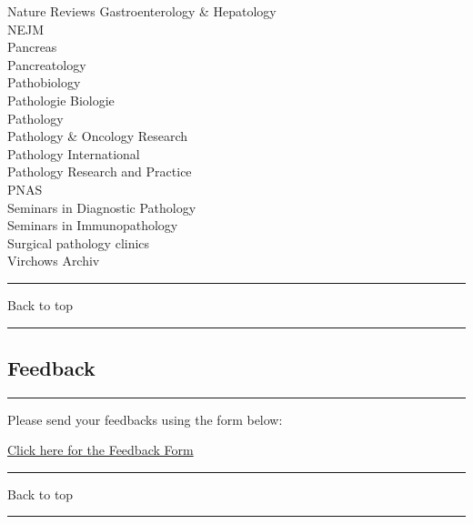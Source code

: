 \documentclass[]{article}
\begin{document}
Nature Reviews Gastroenterology \& Hepatology\\
NEJM\\
Pancreas\\
Pancreatology\\
Pathobiology\\
Pathologie Biologie\\
Pathology\\
Pathology \& Oncology Research\\
Pathology International\\
Pathology Research and Practice\\
PNAS\\
Seminars in Diagnostic Pathology\\
Seminars in Immunopathology\\
Surgical pathology clinics\\
Virchows Archiv

\begin{center}\rule{0.5\linewidth}{\linethickness}\end{center}

Back to top

\begin{center}\rule{0.5\linewidth}{\linethickness}\end{center}

\pagebreak

\hypertarget{feedback}{%
\subsection{Feedback}\label{feedback}}

\begin{center}\rule{0.5\linewidth}{\linethickness}\end{center}

Please send your feedbacks using the form below:

\href{https://docs.google.com/forms/d/e/1FAIpQLSeD3Z9J6Y7eMmiyM12f_SfAmHUlykb1zxZcwO6lg7cebGYQIQ/viewform}{Click
here for the Feedback Form}

\begin{center}\rule{0.5\linewidth}{\linethickness}\end{center}

Back to top

\begin{center}\rule{0.5\linewidth}{\linethickness}\end{center}

\pagebreak
\end{document}

